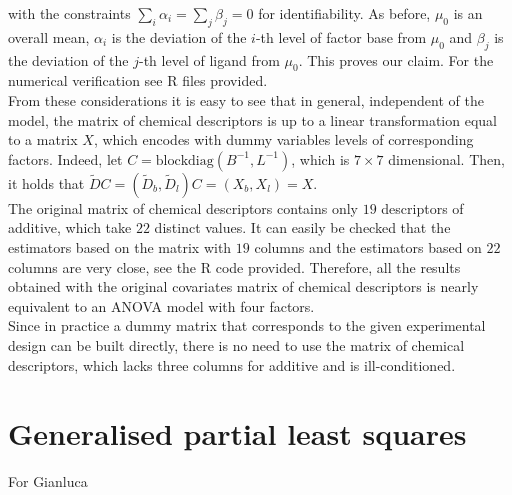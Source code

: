 \documentclass[12pt]{article}
\newcommand{\biblist}{


}
\begin{document}
with the constraints $\sum_i\alpha_i=\sum_j\beta_j=0$ for identifiability. As before, $\mu_0$ is an overall mean, $\alpha_i$ is the deviation of the $i$-th level of factor {\color{blue} base} from $\mu_0$ and $\beta_j$ is the deviation of the $j$-th level of {\color{blue} ligand} from $\mu_0$. This proves our claim. For the numerical verification see R files provided.\\From these considerations it is easy to see that in general, independent of the model, the matrix of chemical descriptors is up to a linear transformation equal to a matrix $X$, which encodes with dummy variables levels of corresponding factors. Indeed, let $C=\mbox{blockdiag}(B^{-1},L^{-1})$, which is $7\times 7$ dimensional. Then, it holds that $\widetilde{D}C=(\widetilde{D}_b,\widetilde{D}_l)C=(X_b,X_l)=X$. \\
The original matrix of chemical descriptors contains only $19$ descriptors of {\color{blue} additive}, which take $22$ distinct values. It can easily be checked that the estimators based on the matrix with $19$ columns and the estimators based on $22$ columns are very close, see the R code provided. Therefore, all the results obtained with the original covariates matrix of chemical descriptors is nearly equivalent to an ANOVA model with four factors. \\
Since in practice a dummy matrix that corresponds to the given experimental design can be built directly, there is no need to use the matrix of chemical descriptors, which lacks three columns for {\color{blue} additive} and is ill-conditioned.
\section{Generalised partial least squares}
{\color{red} For Gianluca}

\end{document}
